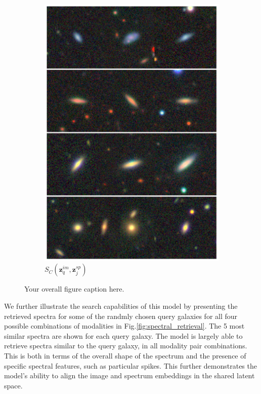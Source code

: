 \documentclass[a4paper,12pt]{article}
\begin{document}
\begin{figure}[H]
\begin{subfigure}{0.22\textwidth}
        \includegraphics[height=0.21\textheight]{../figures/images_sp_im.png}
        \caption{$S_C(\mathbf{z}_q^{im}, \mathbf{z}_j^{sp})$}
        \label{fig:retrieval_5}
    \end{subfigure}
    \caption{Your overall figure caption here.}
    \label{fig:retrieval}
\end{figure}
We further illustrate the search capabilities of this model by presenting the retrieved spectra for some of the randmly chosen query galaxies for all four possible combinations of modalities in Fig.\ref{fig:spectral_retrieval}. The 5 most similar spectra are shown for each query galaxy. The model is largely able to retrieve spectra similar to the query galaxy, in all modality pair combinations. This is both in terms of the overall shape of the spectrum and the presence of specific spectral features, such as particular spikes. This further demonstrates the model's ability to align the image and spectrum embeddings in the shared latent space.
\end{document}
